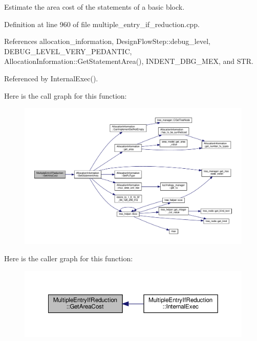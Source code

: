 Estimate the area cost of the statements of a basic block. 



Definition at line 960 of file multiple\+\_\+entry\+\_\+if\+\_\+reduction.\+cpp.



References allocation\+\_\+information, Design\+Flow\+Step\+::debug\+\_\+level, D\+E\+B\+U\+G\+\_\+\+L\+E\+V\+E\+L\+\_\+\+V\+E\+R\+Y\+\_\+\+P\+E\+D\+A\+N\+T\+IC, Allocation\+Information\+::\+Get\+Statement\+Area(), I\+N\+D\+E\+N\+T\+\_\+\+D\+B\+G\+\_\+\+M\+EX, and S\+TR.



Referenced by Internal\+Exec().

Here is the call graph for this function\+:
\nopagebreak
\begin{figure}[H]
\begin{center}
\leavevmode
\includegraphics[width=350pt]{d3/d5a/classMultipleEntryIfReduction_ac6f3dc9035b0d68e3130655939dc1d16_cgraph}
\end{center}
\end{figure}
Here is the caller graph for this function\+:
\nopagebreak
\begin{figure}[H]
\begin{center}
\leavevmode
\includegraphics[width=350pt]{d3/d5a/classMultipleEntryIfReduction_ac6f3dc9035b0d68e3130655939dc1d16_icgraph}
\end{center}
\end{figure}
\mbox{\label{classMultipleEntryIfReduction_a0aed1493c46ae158341d4dffef7aae62}} 
